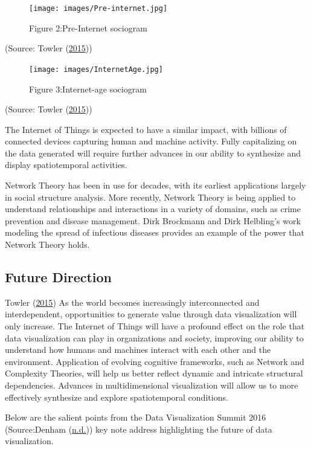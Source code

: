 \documentclass[]{book}
\begin{document}
\begin{figure}
\centering
\texttt{[image: images/Pre-internet.jpg]}
\caption{Figure 2:Pre-Internet sociogram}
\end{figure}

(Source: Towler (\protect\hyperlink{ref-future_viz}{2015}))

\begin{figure}
\centering
\texttt{[image: images/InternetAge.jpg]}
\caption{Figure 3:Internet-age sociogram}
\end{figure}

(Source: Towler (\protect\hyperlink{ref-future_viz}{2015}))

The Internet of Things is expected to have a similar impact, with billions of connected devices capturing human and machine activity. Fully capitalizing on the data generated will require further advances in our ability to synthesize and display spatiotemporal activities.

Network Theory has been in use for decades, with its earliest applications largely in social structure analysis. More recently, Network Theory is being applied to understand relationships and interactions in a variety of domains, such as crime prevention and disease management. Dirk Brockmann and Dirk Helbling's work modeling the spread of infectious diseases provides an example of the power that Network Theory holds.

\hypertarget{future-direction}{%
\subsection{Future Direction}\label{future-direction}}

Towler (\protect\hyperlink{ref-future_viz}{2015})
As the world becomes increasingly interconnected and interdependent, opportunities to generate value through data visualization will only increase. The Internet of Things will have a profound effect on the role that data visualization can play in organizations and society, improving our ability to understand how humans and machines interact with each other and the environment. Application of evolving cognitive frameworks, such as Network and Complexity Theories, will help us better reflect dynamic and intricate structural dependencies. Advances in multidimensional visualization will allow us to more effectively synthesize and explore spatiotemporal conditions.

Below are the salient points from the Data Visualization Summit 2016 (Source:Denham (\protect\hyperlink{ref-speaker_notes}{n.d.})) key note address highlighting the future of data visualization.
\end{document}
